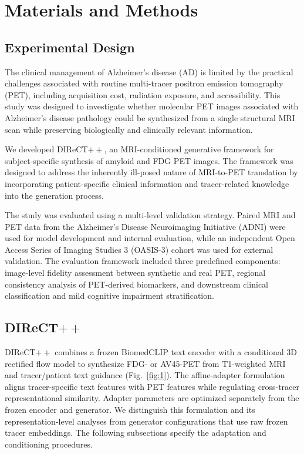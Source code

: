 \documentclass{article}
\begin{document}
\section{Materials and Methods}
\subsection{Experimental Design}

The clinical management of Alzheimer's disease (AD) is limited by the
practical challenges associated with routine multi-tracer positron emission
tomography (PET), including acquisition cost, radiation exposure, and
accessibility. This study was designed to investigate whether molecular PET
images associated with Alzheimer's disease pathology could be synthesized
from a single structural MRI scan while preserving biologically and
clinically relevant information.

We developed DIReCT$++$, an MRI-conditioned generative framework for
subject-specific synthesis of amyloid and FDG PET images. The framework was
designed to address the inherently ill-posed nature of MRI-to-PET translation
by incorporating patient-specific clinical information and tracer-related
knowledge into the generation process.

The study was evaluated using a multi-level validation strategy. Paired MRI
and PET data from the Alzheimer's Disease Neuroimaging Initiative (ADNI) were
used for model development and internal evaluation, while an independent
Open Access Series of Imaging Studies 3 (OASIS-3) cohort was used for
external validation. The evaluation framework included three predefined
components: image-level fidelity assessment between synthetic and real PET,
regional consistency analysis of PET-derived biomarkers, and downstream
clinical classification and mild cognitive impairment stratification.


\subsection{\texorpdfstring{DIReCT$++$}{DIReCT++}}
DIReCT$++$ combines a frozen BiomedCLIP text encoder with a conditional 3D rectified flow model to synthesize FDG- or AV45-PET from T1-weighted MRI and tracer/patient text guidance (Fig.~\ref{fig:1}). The affine-adapter formulation aligns tracer-specific text features with PET features while regulating cross-tracer representational similarity. Adapter parameters are optimized separately from the frozen encoder and generator. We distinguish this formulation and its representation-level analyses from generator configurations that use raw frozen tracer embeddings. The following subsections specify the adaptation and conditioning procedures.
\end{document}
